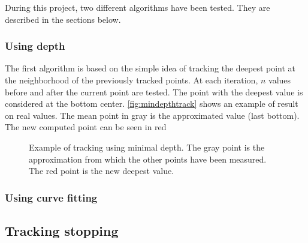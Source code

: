 During this project, two different algorithms have been tested. They are described in the sections below.

\subsubsection{Using depth}

The first algorithm is based on the simple idea of tracking the deepest point at the neighborhood of the previously tracked points. At each iteration, $n$ values before and after the current point are tested. The point with the deepest value is considered at the bottom center. \autoref{fig:mindepthtrack} shows an example of result on real values. The mean point in gray is the approximated value (last bottom). The new computed point can be seen in red

\begin{figure}[!ht]
\centering
{}
\caption[Example of tracking using minimal depth.]
{Example of tracking using minimal depth. The gray point is the approximation from which the other points have been measured. The red point is the new deepest value.}
\label{fig:mindepthtrack}
\end{figure}

\subsubsection{Using curve fitting}



\subsection{Tracking stopping}

